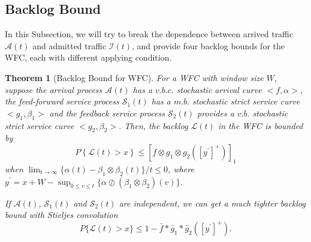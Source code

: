 \documentclass[paper]{ieice}
\newtheorem{theorem}{Theorem}
\begin{document}
\subsection{Backlog Bound}\label{backlog}
In this Subsection, we will try to break the dependence between arrived traffic $\mathcal{A}(t)$ and admitted traffic $\mathcal{I}(t)$, and provide four backlog bounds for the WFC, each with different applying condition.
\begin{theorem}[Backlog Bound for WFC]\label{theorem1}
For a WFC with window size $W$, suppose the arrival process $\mathcal{A}(t)$ has a $v.b.c.$ stochastic arrival curve $<f,\alpha>$, the feed-forward service process $\mathcal{S}_1(t)$ has a $m.b.$ stochastic strict service curve $<g_1,\beta_1>$ and the feedback service process $\mathcal{S}_2(t)$ provides a $v.b.$ stochastic strict service curve $<g_2,\beta_2>$. Then, the backlog $\mathcal{L}(t)$ in the WFC is bounded by
\begin{equation}\label{eqn1}
P\left\{\mathcal{L}(t)>x\right\}\leq [f\otimes g_1\otimes g_2([y^\prime]^+)]_1
\end{equation}
when $\lim_{t\to\infty}\{\alpha(t)-\beta_1\otimes\beta_2(t)\}/t\leq 0$, where $y^\prime=x+W-\sup_{0\leq v\leq t}\{\alpha\oslash(\beta_1\otimes\beta_2)(v)\}$.

If $\mathcal{A}(t)$, $\mathcal{S}_1(t)$ and $\mathcal{S}_2(t)$ are independent, we can get a much tighter backlog bound with Stieljes convolution
\begin{equation}\label{eqn2}
P\{\mathcal{L}(t)>x\}\leq 1-\bar{f}\ast\bar{g}_1\ast\bar{g}_2([y^\prime]^+).
\end{equation}
\end{theorem}
\end{document}

